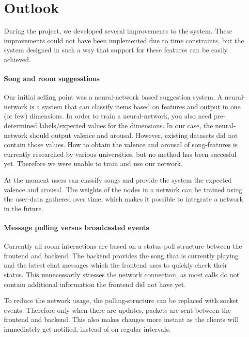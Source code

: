 \chapter{Outlook}
During the project, we developed several improvements to the system.
These improvements could not have been implemented due to time constraints, but the system designed in such a way that support for these features can be easily achieved.

\label{outlook-neural}
\subsubsection{Song and room suggesstions}
Our initial selling point was a neural-network based suggestion system.
A neural-network is a system that can classify items based on features and output in one (or few) dimensions.
In order to train a neural-network, you also need pre-determined labels/expected values for the dimensions.
In our case, the neural-network should output \gls{valence} and \gls{arousal}.
However, existing datasets did not contain those values.
How to obtain the valence and arousal of song-features is currently researched by various universities, but no method has been succesful yet.
Therefore we were unable to train and use our network.

At the moment users can classify songs and provide the system the expected valence and arousal.
The weights of the nodes in a network can be trained using the user-data gathered over time, which makes it possible to integrate a network in the future.

\subsubsection{Message polling versus broadcasted events}
Currently all room interactions are based on a status-poll structure between the frontend and backend.
The backend provides the song that is currently playing and the latest chat messages which the frontend uses to quickly check their status.
This unnecessarily stresses the network connection, as most calls do not contain additional information the frontend did not have yet.

To reduce the network usage, the polling-structure can be replaced with socket events.
Therefore only when there are updates, packets are sent between the frontend and backend.
This also makes changes more instant as the clients will immediately get notified, instead of on regular intervals.

